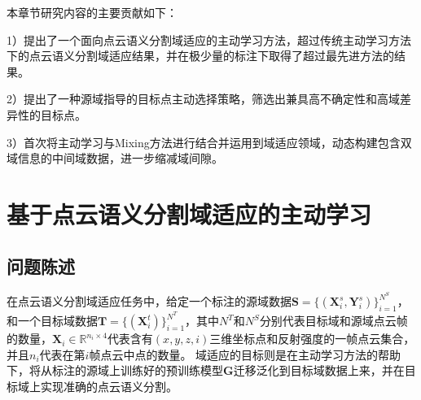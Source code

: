 




本章节研究内容的主要贡献如下：

1）提出了一个面向点云语义分割域适应的主动学习方法，超过传统主动学习方法下的点云语义分割域适应结果，并在极少量的标注下取得了超过最先进方法的结果。

2）提出了一种源域指导的目标点主动选择策略，筛选出兼具高不确定性和高域差异性的目标点。

3）首次将主动学习与Mixing方法进行结合并运用到域适应领域，动态构建包含双域信息的中间域数据，进一步缩减域间隙。


\section{基于点云语义分割域适应的主动学习}
\subsection{问题陈述}
在点云语义分割域适应任务中，给定一个标注的源域数据\(\mathbf{S} = \{(\mathbf{X}_i^s, \mathbf{Y}_i^s)\}_{i=1}^{N^S}\)，和一个目标域数据$\mathbf{T} = \{(\mathbf{X}_i^t)\}_{i=1}^ {N^T}$，其中\(N^T\)和\(N^S\)分别代表目标域和源域点云帧的数量，$\mathbf{X}_i \in \mathbb{R}^{{n_i} \times 4}$代表含有$(x,y,z,i)$三维坐标点和反射强度的一帧点云集合，并且$n_i$代表在第$i$帧点云中点的数量。 域适应的目标则是在主动学习方法的帮助下，将从标注的源域上训练好的预训练模型$\mathbf{G}$迁移泛化到目标域数据上来，并在目标域上实现准确的点云语义分割。

